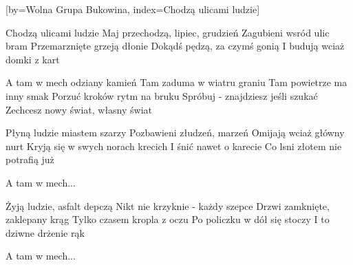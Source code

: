[by={Wolna Grupa Bukowina},
                     index={Chodzą ulicami ludzie}]
\beginverse

Chodzą ulicami ludzie
Maj przechodzą, lipiec, grudzień
Zagubieni wsród ulic bram
Przemarznięte grzeją dłonie
Dokądś pędzą, za czymś gonią
I budują wciaż domki z kart

\endverse
\beginverse

A tam w mech odziany kamień
Tam zaduma w wiatru graniu
Tam powietrze ma inny smak
Porzuć kroków rytm na bruku
Spróbuj - znajdziesz jeśli szukać
Zechcesz nowy świat, własny świat

\endverse
\beginverse

Płyną ludzie miastem szarzy
Pozbawieni złudzeń, marzeń
Omijają wciaż główny nurt
Kryją się w swych norach krecich
I śnić nawet o karecie
Co lsni złotem nie potrafią już

\endverse
\beginverse

A tam w mech...

\endverse
\beginverse

Żyją ludzie, asfalt depczą
Nikt nie krzyknie - każdy szepce
Drzwi zamknięte, zaklepany krąg
Tylko czasem kropla z oczu
Po policzku w dół się stoczy
I to dziwne drżenie rąk

\endverse
\beginverse

A tam w mech...

\endverse
\endsong